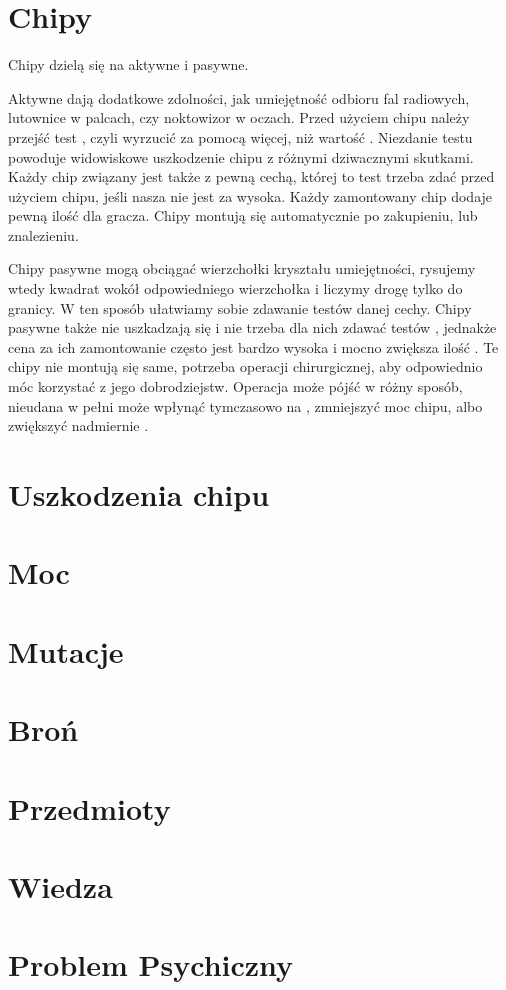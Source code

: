 \section{Chipy}
Chipy dzielą się na aktywne i pasywne.

Aktywne dają dodatkowe zdolności, jak umiejętność odbioru fal radiowych, lutownice w palcach, czy noktowizor w oczach.
Przed użyciem chipu należy przejść test \abnkp, czyli wyrzucić za pomocą \dxx więcej, niż wartość \abnkp. 
Niezdanie testu \abnkp powoduje widowiskowe uszkodzenie chipu z różnymi dziwacznymi skutkami.
Każdy chip związany jest także z pewną cechą, której to test trzeba zdać przed użyciem chipu, jeśli nasza \abnkp nie jest za wysoka.
Każdy zamontowany chip dodaje pewną ilość \abnkp dla gracza.
Chipy montują się automatycznie po zakupieniu, lub znalezieniu.

Chipy pasywne mogą obciągać wierzchołki kryształu umiejętności, rysujemy wtedy kwadrat wokół odpowiedniego wierzchołka i liczymy drogę tylko do granicy.
W ten sposób ułatwiamy sobie zdawanie testów danej cechy.
Chipy pasywne także nie uszkadzają się i nie trzeba dla nich zdawać testów \abnkp, jednakże cena za ich zamontowanie często jest bardzo wysoka i mocno zwiększa ilość \abnkp.
Te chipy nie montują się same, potrzeba operacji chirurgicznej, aby odpowiednio móc korzystać z jego dobrodziejstw.
Operacja może pójść w różny sposób, nieudana w pełni może wpłynąć tymczasowo na \abzyc, zmniejszyć moc chipu, albo zwiększyć nadmiernie \abnkp.

\section{Uszkodzenia chipu}

\section{Moc}
\section{Mutacje}

\section{Broń}
\section{Przedmioty}
\section{Wiedza}

\section{Problem Psychiczny}





